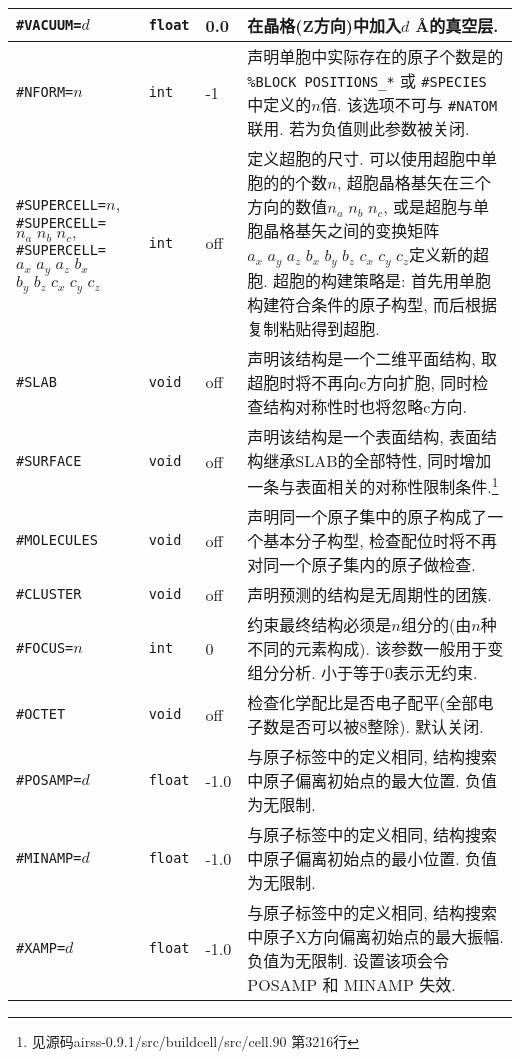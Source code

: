 \documentclass[a4paper, 10pt]{article}
\begin{document}
\begin{center}
\begin{longtable}{m{10em}|m{4em}<{\centering}|m{3em}<{\centering}|m{15em}}
\midrule
\verb|#VACUUM=|\(d\) & \verb|float| & 0.0 & 在晶格(Z方向)中加入\(d\) \r{A}的真空层.\\
\midrule
\verb|#NFORM=|\(n\) & \verb|int| & -1 & 声明单胞中实际存在的原子个数是的 \verb|%BLOCK POSITIONS_*| 或 \verb|#SPECIES| 中定义的\(n\)倍. 该选项不可与 \verb|#NATOM| 联用. 若为负值则此参数被关闭.\\
\midrule
\verb|#SUPERCELL=|\(n\), \verb|#SUPERCELL=|\(n_a\;n_b\;n_c,\;\;\;\;\;\;\) \hspace{2em}\verb|#SUPERCELL=|\(a_x\; a_y\;a_z\;b_x\)\hspace{2em} \(b_y\;b_z\;c_x\;c_y\;c_z\) & \verb|int| & off & 定义超胞的尺寸. 可以使用超胞中单胞的的个数\(n\), 超胞晶格基矢在三个方向的数值\(n_a\;n_b\;n_c\), 或是超胞与单胞晶格基矢之间的变换矩阵\(a_x\;a_y\;a_z\;b_x\;b_y\;b_z\;c_x\;c_y\;c_z\)定义新的超胞. 超胞的构建策略是: 首先用单胞构建符合条件的原子构型, 而后根据复制粘贴得到超胞.\\
\midrule
\verb|#SLAB| & \verb|void| & off & 声明该结构是一个二维平面结构, 取超胞时将不再向c方向扩胞, 同时检查结构对称性时也将忽略c方向.\\
\midrule
\verb|#SURFACE| & \verb|void| & off & 声明该结构是一个表面结构, 表面结构继承SLAB的全部特性, 同时增加一条与表面相关的对称性限制条件.\footnote{见源码airss-0.9.1/src/buildcell/src/cell.90 第3216行}\\
\midrule
\verb|#MOLECULES|& \verb|void| & off & 声明同一个原子集中的原子构成了一个基本分子构型, 检查配位时将不再对同一个原子集内的原子做检查.\\
\midrule
\verb|#CLUSTER| & \verb|void| & off & 声明预测的结构是无周期性的团簇.\\
\midrule
\verb|#FOCUS=|\(n\) & \verb|int| & 0 & 约束最终结构必须是\(n\)组分的(由\(n\)种不同的元素构成). 该参数一般用于变组分分析. 小于等于0表示无约束.\\
\midrule
\verb|#OCTET|& \verb|void| & off & 检查化学配比是否电子配平(全部电子数是否可以被8整除). 默认关闭.\\
\midrule
\verb|#POSAMP=|\(d\) & \verb|float|  & -1.0 & 与原子标签中的定义相同, 结构搜索中原子偏离初始点的最大位置. 负值为无限制.\\
\midrule
\verb|#MINAMP=|\(d\) & \verb|float| & -1.0 & 与原子标签中的定义相同, 结构搜索中原子偏离初始点的最小位置. 负值为无限制.\\
\midrule
\verb|#XAMP=|\(d\) & \verb|float| & -1.0 & 与原子标签中的定义相同, 结构搜索中原子X方向偏离初始点的最大振幅. 负值为无限制. 设置该项会令 POSAMP 和 MINAMP 失效. \\
\midrule

\end{longtable}
\end{center}
\end{document}
